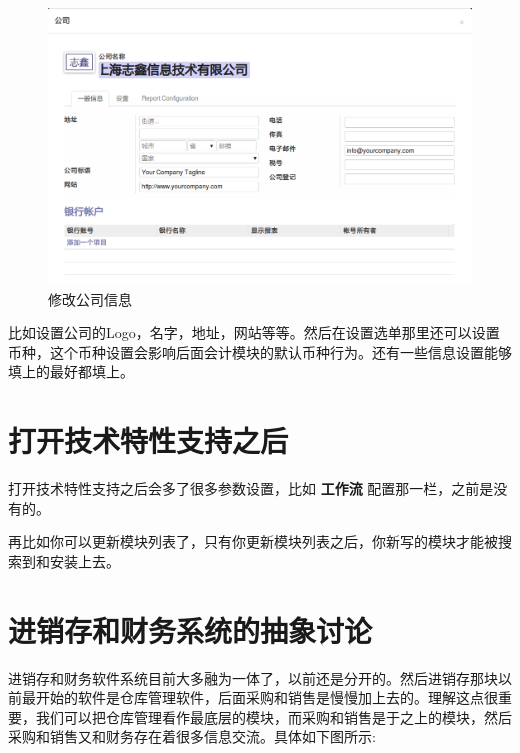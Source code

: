 \documentclass[11pt,a4paper]{sphinxmanual}
\begin{document}
\begin{figure}[H]
\centering
\includegraphics[keepaspectratio,max width=0.95\linewidth]{images/修改公司信息.png}
\caption{修改公司信息}
\end{figure}

比如设置公司的Logo，名字，地址，网站等等。然后在设置选单那里还可以设置币种，这个币种设置会影响后面会计模块的默认币种行为。还有一些信息设置能够填上的最好都填上。



\section{打开技术特性支持之后}
\label{sec-4-8}
打开技术特性支持之后会多了很多参数设置，比如 \textbf{工作流} 配置那一栏，之前是没有的。

再比如你可以更新模块列表了，只有你更新模块列表之后，你新写的模块才能被搜索到和安装上去。



\section{进销存和财务系统的抽象讨论}
\label{sec-4-9}
进销存和财务软件系统目前大多融为一体了，以前还是分开的。然后进销存那块以前最开始的软件是仓库管理软件，后面采购和销售是慢慢加上去的。理解这点很重要，我们可以把仓库管理看作最底层的模块，而采购和销售是于之上的模块，然后采购和销售又和财务存在着很多信息交流。具体如下图所示: 
\end{document}
